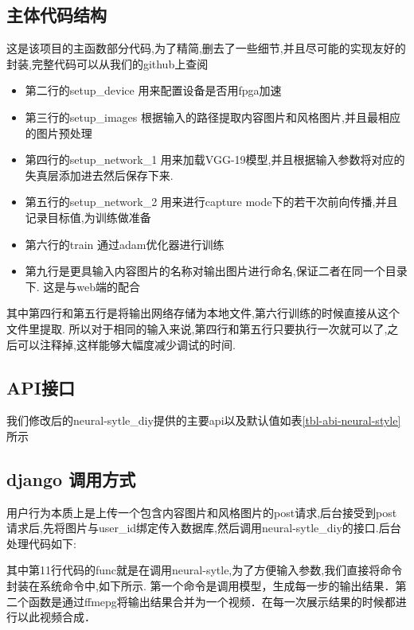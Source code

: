 \subsection{主体代码结构}
这是该项目的主函数部分代码,为了精简,删去了一些细节,并且尽可能的实现友好的封装,完整代码可以从我们的github\cite{neural-style-diy}上查阅
\begin{itemize}
\item 第二行的setup\_device 用来配置设备是否用fpga加速
\item 第三行的setup\_images 根据输入的路径提取内容图片和风格图片,并且最相应的图片预处理
\item 第四行的setup\_network\_1 用来加载VGG-19模型,并且根据输入参数将对应的失真层添加进去然后保存下来.
\item 第五行的setup\_network\_2 用来进行capture mode下的若干次前向传播,并且记录目标值,为训练做准备
\item 第六行的train 通过adam优化器进行训练
\item 第九行是更具输入内容图片的名称对输出图片进行命名,保证二者在同一个目录下. 这是与web端的配合
\end{itemize}
其中第四行和第五行是将输出网络存储为本地文件,第六行训练的时候直接从这个文件里提取.
所以对于相同的输入来说,第四行和第五行只要执行一次就可以了,之后可以注释掉,这样能够大幅度减少调试的时间.
\subsection{API接口}
我们修改后的neural-sytle\_diy提供的主要api以及默认值如表\ref{tbl-abi-neural-style}所示
\subsection{django 调用方式}
用户行为本质上是上传一个包含内容图片和风格图片的post请求,后台接受到post请求后,先将图片与user\_id绑定传入数据库,然后调用neural-sytle\_diy的接口.后台处理代码如下:

其中第11行代码的func就是在调用neural-sytle,为了方便输入参数,我们直接将命令封装在系统命令中,如下所示. 第一个命令是调用模型，生成每一步的输出结果．第二个函数是通过ffmepg将输出结果合并为一个视频．在每一次展示结果的时候都进行以此视频合成．
